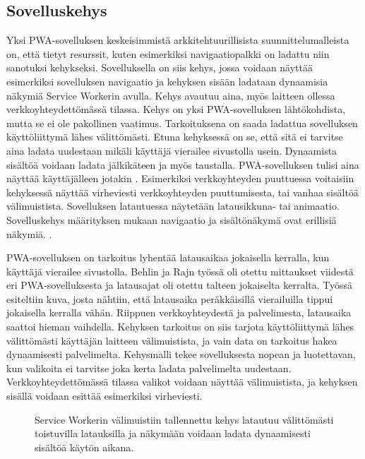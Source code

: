 \documentclass{tktltiki}
\begin{document}
\subsection{Sovelluskehys}

Yksi PWA-sovelluksen keskeisimmistä arkkitehtuurillisista suunnittelumalleista on, että tietyt resurssit, kuten esimerkiksi navigaatiopalkki on ladattu niin sanotuksi kehykseksi. \cite{8441701} Sovelluksella on siis kehys, jossa voidaan näyttää esimerkiksi sovelluksen navigaatio ja kehyksen sisään ladataan dynaamisia näkymiä Service Workerin avulla. Kehys avautuu aina, myös laitteen ollessa verkkoyhteydettömässä tilassa. Kehys on yksi PWA-sovelluksen lähtökohdista, mutta se ei ole pakollinen vaatimus. Tarkoituksena on saada ladattua sovelluksen käyttöliittymä lähes välittömästi. Etuna kehyksessä on se, että sitä ei tarvitse aina ladata uudestaan mikäli käyttäjä vierailee sivustolla usein. Dynaamista sisältöä voidaan ladata jälkikäteen ja myös taustalla. PWA-sovelluksen tulisi aina näyttää käyttäjälleen jotakin \cite{von2018progressive}. Esimerkiksi verkkoyhteyden puuttuessa voitaisiin kehyksessä näyttää virheviesti verkkoyhteyden puuttumisesta, tai vanhaa sisältöä välimuistista. Sovelluksen latautuessa näytetään latausikkuna- tai animaatio. Sovelluskehys määrityksen mukaan navigaatio ja sisältönäkymä ovat erillisiä näkymiä. \cite{Google4}.

PWA-sovelluksen on tarkoitus lyhentää latausaikaa jokaisella kerralla, kun käyttäjä vierailee sivustolla. Behlin ja Rajn työssä \cite{8441701} oli otettu mittaukset viidestä eri PWA-sovelluksesta ja latausajat oli otettu talteen jokaiselta kerralta. Työssä esiteltiin kuva, josta nähtiin, että latausaika peräkkäisillä vierailuilla tippui jokaisella kerralla vähän. Riippuen verkkoyhteydestä ja palvelimesta, latausaika saattoi hieman vaihdella. Kehyksen tarkoitus on siis tarjota käyttöliittymä lähes välittömästi käyttäjän laitteen välimuistista, ja vain data on tarkoitus hakea dynaamisesti palvelimelta. Kehysmalli tekee sovelluksesta nopean ja luotettavan, kun valikoita ei tarvitse joka kerta ladata palvelimelta uudestaan. Verkkoyhteydettömässä tilassa valikot voidaan näyttää välimuistista, ja kehyksen sisällä voidaan esittää esimerkiksi virheviesti.

\begin{figure}[h]
\begin{center}
\caption{Service Workerin välimuistiin tallennettu kehys latautuu välittömästi toistuvilla latauksilla ja näkymään voidaan ladata dynaamisesti sisältöä käytön aikana. }
\label{App shell}
\end{center}
\end{figure}
\end{document}
